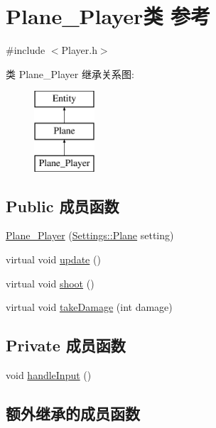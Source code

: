 \hypertarget{class_plane___player}{}\section{Plane\+\_\+\+Player类 参考}
\label{class_plane___player}


{\ttfamily \#include $<$Player.\+h$>$}

类 Plane\+\_\+\+Player 继承关系图\+:\begin{figure}[H]
\begin{center}
\leavevmode
\includegraphics[height=3.000000cm]{class_plane___player}
\end{center}
\end{figure}
\subsection*{Public 成员函数}
\begin{DoxyCompactItemize}
\item 
\hyperlink{class_plane___player_ae07c92eb62cd45f7fd5d12fb570934e2}{Plane\+\_\+\+Player} (\hyperlink{struct_settings_1_1_plane}{Settings\+::\+Plane} setting)
\item 
virtual void \hyperlink{class_plane___player_ae68c08ce11fad9fd164c00eb4db6b348}{update} ()
\item 
virtual void \hyperlink{class_plane___player_a3ffa86506370f74ec859e74d42c568c2}{shoot} ()
\item 
virtual void \hyperlink{class_plane___player_a40e7f20858e2738e5a72b15eb1c28421}{take\+Damage} (int damage)
\end{DoxyCompactItemize}
\subsection*{Private 成员函数}
\begin{DoxyCompactItemize}
\item 
void \hyperlink{class_plane___player_a7a356939196bfe1447fbd5fc03b8c380}{handle\+Input} ()
\end{DoxyCompactItemize}
\subsection*{额外继承的成员函数}


